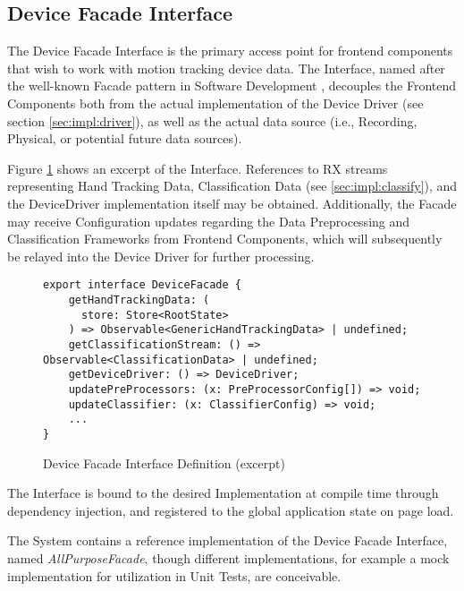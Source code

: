 \subsection{Device Facade Interface}
The Device Facade Interface is the primary access point for frontend components that wish to work with motion tracking device data. The Interface, named after the well-known Facade pattern in Software Development \cite{Gamma:1995:DPE:186897}, decouples the Frontend Components both from the actual implementation of the Device Driver (see section \ref{sec:impl:driver}), as well as the actual data source (i.e., Recording, Physical, or potential future data sources).


Figure \ref{fig:device-facade-interface} shows an excerpt of the Interface. References to \gls{RX} streams representing Hand Tracking Data, Classification Data (see \ref{sec:impl:classify}), and the DeviceDriver implementation itself may be obtained. Additionally, the Facade may receive Configuration updates regarding the Data Preprocessing and Classification Frameworks from Frontend Components, which will subsequently be relayed into the Device Driver for further processing.
\begin{figure}
\begin{verbatim}
export interface DeviceFacade {
    getHandTrackingData: (
      store: Store<RootState>
    ) => Observable<GenericHandTrackingData> | undefined;
    getClassificationStream: () => Observable<ClassificationData> | undefined;
    getDeviceDriver: () => DeviceDriver;
    updatePreProcessors: (x: PreProcessorConfig[]) => void;
    updateClassifier: (x: ClassifierConfig) => void;
    ...
}
\end{verbatim}
\caption{Device Facade Interface Definition (excerpt)}
\label{fig:device-facade-interface}
\end{figure}
The Interface is bound to the desired Implementation at compile time through dependency injection, and registered to the global application state on page load.

The System contains a reference implementation of the Device Facade Interface, named \emph{AllPurposeFacade}, though different implementations, for example a mock implementation for utilization in Unit Tests, are conceivable.
